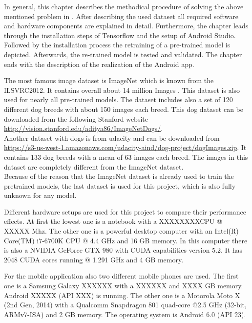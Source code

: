 In general, this chapter describes the methodical procedure of solving the above mentioned problem in . After describing the used dataset all required software and hardware components are explained in detail. Furthermore, the chapter leads through the installation steps of Tensorflow and the setup of Android Studio. Followed by the installation process the retraining of a pre-trained model is depicted. Afterwards, the re-trained model is tested and validated. The chapter ends with the description of the realization of the Android app.

The most famous image dataset is ImageNet which is known from the ILSVRC2012. It contains overall about 14 million Images \citep{ImageNet2010}. This dataset is also used for nearly all pre-trained models. The dataset includes also a set of 120 different dog breeds with about 150 images each breed. This dog dataset can be downloaded from the following Stanford website \url{http://vision.stanford.edu/aditya86/ImageNetDogs/}. \\
Another dataset with dogs is from udacity and can be downloaded from \url{https://s3-us-west-1.amazonaws.com/udacity-aind/dog-project/dogImages.zip}. It contains 133 dog breeds with a mean of 63 images each breed. The images in this dataset are completely different from the ImageNet dataset. \\

Because of the reason that the ImageNet dataset is already used to train the pretrained models, the last dataset is used for this project, which is also fully unknown for any model.

Different hardware setups are used for this project to compare their performance effects.
At first the lowest one is a notebook with a XXXXXXXXCPU @ XXXXX Mhz.
The other one is a powerful desktop computer with an Intel(R) Core(TM) i7-6700K CPU @ 4.4 GHz and 16 GB memory.
In this computer there is also a NVIDIA GeForce GTX 980 with CUDA capabilities version 5.2. It has 2048 CUDA cores running @ 1.291 GHz and 4 GB memory.

For the mobile application also two different mobile phones are used. The first one is a Samsung Galaxy XXXXXX with a XXXXXX and XXXX GB memory. Android XXXXX (API XXX) is running.
The other one is a Motorola Moto X (2nd Gen, 2014) with a Qualcomm Snapdragon 801 quad-core @2.5 GHz (32-bit, ARMv7-ISA) and 2 GB memory. The operating system is Android 6.0 (API 23).


